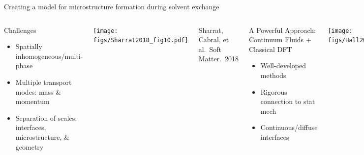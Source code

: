 \documentclass[aspectratio=169]{beamer}
\begin{document}
\begin{frame}[t]{Creating a model for microstructure formation during solvent exchange}

  \begin{columns}[T]


      \centering
      \vspace{-0.5\baselineskip}
      \begin{block}{Challenges}
        \begin{itemize}
          \item Spatially inhomogeneous/multi-phase
          \item Multiple transport modes: mass \& momentum 
          \item Separation of scales: interfaces, microstructure, \& geometry
        \end{itemize}
      \end{block}

      \vspace{6pt}
      \texttt{[image: figs/Sharrat2018\_fig10.pdf]}\par%
      \vspace{6pt}
      {\scriptsize Sharrat, Cabral, et al.\ Soft Matter.\ 2018\par}
          

      \centering
      \vspace{-0.5\baselineskip}
      \begin{block}{A Powerful Approach:\\Continuum Fluids + Classical DFT}
          \begin{itemize}
            \item Well-developed methods
            \item Rigorous connection to stat mech
            \item Continuous/diffuse interfaces
          \end{itemize}
      \end{block}

      \vspace{6pt}
      \texttt{[image: figs/Hall2006\_Fig2.pdf]}\par
      \vspace{6pt}
      {\scriptsize Fredrickson.\ J.\ Chem.\ Phys.\ (2002) \par
      Hall et al.\ Phys.\ Rev.\ Lett.\ (2006) \par
      M{\"u}ller and de Pablo. Ann.\ Rev.\ Mater. Res.\ (2013)\par
      }


\end{columns}
\end{frame}
\end{document}
